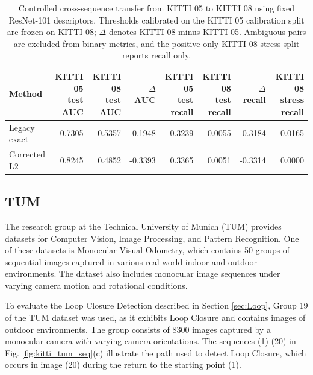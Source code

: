 \documentclass{ieeeaccess}
\begin{document}
\begin{table}[t]
\centering
\caption{Controlled cross-sequence transfer from KITTI 05 to KITTI 08 using fixed ResNet-101 descriptors. Thresholds calibrated on the KITTI 05 calibration split are frozen on KITTI 08; $\Delta$ denotes KITTI 08 minus KITTI 05. Ambiguous pairs are excluded from binary metrics, and the positive-only KITTI 08 stress split reports recall only.}
\label{tab:kitti08_cross_sequence_transfer}
\small
\renewcommand{\arraystretch}{1.12}
\begin{tabular*}{\textwidth}{@{\extracolsep{\fill}}lrrrrrrr@{}}
\hline
Method & \shortstack{KITTI 05\\test AUC} & \shortstack{KITTI 08\\test AUC} & $\Delta$AUC & \shortstack{KITTI 05\\test recall} & \shortstack{KITTI 08\\test recall} & $\Delta$recall & \shortstack{KITTI 08\\stress recall} \\
\hline
Legacy exact & 0.7305 & 0.5357 & -0.1948 & 0.3239 & 0.0055 & -0.3184 & 0.0165 \\
Corrected L2 & 0.8245 & 0.4852 & -0.3393 & 0.3365 & 0.0051 & -0.3314 & 0.0000 \\
\hline
\end{tabular*}
\end{table}

\subsection{TUM}

The research group at the Technical University of Munich (TUM) provides datasets for Computer Vision, Image Processing, and Pattern Recognition. One of these datasets is Monocular Visual Odometry, which contains 50 groups of sequential images captured in various real-world indoor and outdoor environments. The dataset also includes monocular image sequences under varying camera motion and rotational conditions. 

To evaluate the Loop Closure Detection described in Section \ref{sec:Loop}, Group 19 of the TUM dataset was used, as it exhibits Loop Closure and contains images of outdoor environments. The group consists of 8300 images captured by a monocular camera with varying camera orientations. The sequences (1)-(20) in Fig. \ref{fig:kitti_tum_seq}(c) illustrate the path used to detect Loop Closure, which occurs in image (20) during the return to the starting point (1). 
\end{document}
